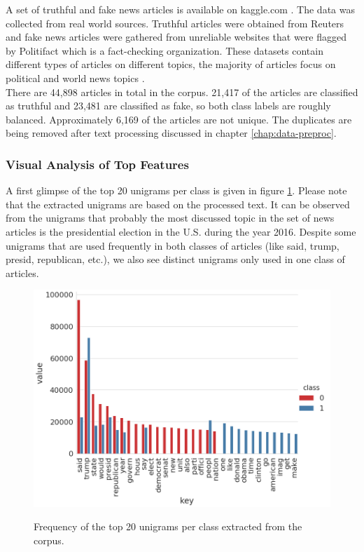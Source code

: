 \documentclass[a4paper,12pt,nottoc]{article}
\begin{document}
A set of truthful and fake news articles is available on kaggle.com \cite{bib:kaggle}. The data was collected from real world sources. Truthful articles were obtained from Reuters and fake news articles were gathered from unreliable websites that were flagged by Politifact which is a fact-checking organization. These datasets contain different types of articles on different topics, the majority of articles focus on political and world news topics \cite{bib:ahmed-2018}.\\

\noindent There are 44,898 articles in total in the corpus. 21,417 of the articles are classified as truthful and 23,481 are classified as fake, so both class labels are roughly balanced. Approximately 6,169 of the articles are not unique. The duplicates are being removed after text processing discussed in chapter \ref{chap:data-preproc}.

\subsubsection{Visual Analysis of Top Features}

A first glimpse of the top 20 unigrams per class is given in figure \ref{fig:top20}. Please note that the extracted unigrams are based on the processed text. It can be observed from the unigrams that probably the most discussed topic in the set of news articles is the presidential election in the U.S. during the year 2016. Despite some unigrams that are used frequently in both classes of articles (like said, trump, presid, republican, etc.), we also see distinct unigrams only used in one class of articles.

\begin{figure}[h]
\caption{Frequency of the top 20 unigrams per class extracted from the corpus.}
\includegraphics[width=14cm]{output/word_analysis_1.png}
\centering
\label{fig:top20}
\end{figure}
\end{document}
